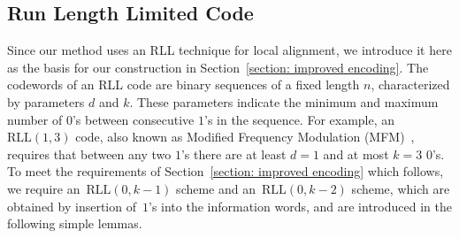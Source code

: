 \documentclass[journal,letterpaper,onecolumn,11pt]{IEEEtran}
\begin{document}
\subsection{Run Length Limited Code}\label{section:rll}
Since our method uses an RLL technique for local alignment, we introduce it here as the basis for our construction in Section~\ref{section: improved encoding}.
The codewords of an RLL code are binary sequences of a fixed length $n$, characterized by parameters $d$ and $k$. 
These parameters indicate the minimum and maximum number of $0$'s between consecutive $1$'s in the sequence. 
For example, an $\text{RLL}(1,3)$ code, also known as Modified Frequency Modulation (MFM)~\cite{immink1990runlength}, requires that between any two $1$'s there are at least $d=1$ and at most $k=3$ $0$'s.
To meet the requirements of Section~\ref{section: improved encoding} which follows, 
we require an~$\mathrm{RLL}(0,k-1)$ scheme and an~$\mathrm{RLL}(0,k-2)$ scheme, which are obtained by insertion of~$1$'s into the information words, and are introduced in the following simple lemmas. 

\end{document}
